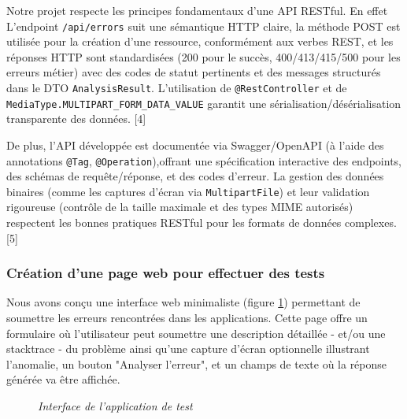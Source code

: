 \documentclass[12pt,a4paper]{report}
\begin{document}
	Notre projet respecte les principes fondamentaux d'une API RESTful. En effet L'endpoint \verb|/api/errors| suit une sémantique HTTP claire, la méthode POST est utilisée pour la création d'une ressource, conformément aux verbes REST, et les réponses HTTP sont standardisées (200 pour le succès, 400/413/415/500 pour les erreurs métier) avec des codes de statut pertinents et des messages structurés dans le DTO \verb|AnalysisResult|. L'utilisation de \verb|@RestController| et de \\ \verb|MediaType.MULTIPART_FORM_DATA_VALUE| garantit une sérialisation/désérialisation transparente des données. [4]
	
	De plus, l'API développée est documentée via Swagger/OpenAPI (à l'aide des annotations \verb|@Tag|, \verb|@Operation|),offrant une spécification interactive des endpoints, des schémas de requête/réponse, et des codes d'erreur. La gestion des données binaires (comme les captures d'écran via \verb|MultipartFile|) et leur validation rigoureuse (contrôle de la taille maximale et des types MIME autorisés) respectent les bonnes pratiques RESTful pour les formats de données complexes. [5]
	
	\subsubsection{Création d'une page web pour effectuer des tests}
	
	Nous avons conçu une interface web minimaliste (figure \ref{fig:interface}) permettant de soumettre les erreurs rencontrées dans les applications. Cette page offre un formulaire où l'utilisateur peut soumettre une description détaillée - et/ou une stacktrace  - du problème ainsi qu’une capture d’écran optionnelle illustrant l’anomalie, un bouton "Analyser l'erreur", et un champs de texte où la réponse générée va être affichée.
	
	\begin{figure}[H]
		\centering
		\caption{\textit{Interface de l'application de test}}
		\label{fig:interface}
	\end{figure}
	
\end{document}
